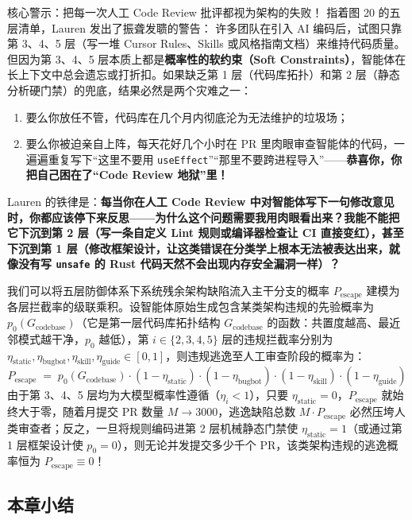\documentclass[a4paper]{article}
\begin{document}
\begin{warningbox}{核心警示：把每一次人工 Code Review 批评都视为架构的失败！}
指着图 20 的五层清单，Lauren 发出了振聋发聩的警告：
许多团队在引入 AI 编码后，试图只靠第 3、4、5 层（写一堆 Cursor Rules、Skills 或风格指南文档）来维持代码质量。但因为第 3、4、5 层本质上都是\textbf{概率性的软约束（Soft Constraints）}，智能体在长上下文中总会遗忘或打折扣。如果缺乏第 1 层（代码库拓扑）和第 2 层（静态分析硬门禁）的兜底，结果必然是两个灾难之一：
\begin{enumerate}
  \item 要么你放任不管，代码库在几个月内彻底沦为无法维护的垃圾场；
  \item 要么你被迫亲自上阵，每天花好几个小时在 PR 里肉眼审查智能体的代码，一遍遍重复写下“这里不要用 \texttt{useEffect}”“那里不要跨进程导入”——\textbf{恭喜你，你把自己困在了“Code Review 地狱”里！}
\end{enumerate}
Lauren 的铁律是：\textbf{每当你在人工 Code Review 中对智能体写下一句修改意见时，你都应该停下来反思——为什么这个问题需要我用肉眼看出来？我能不能把它下沉到第 2 层（写一条自定义 Lint 规则或编译器检查让 CI 直接变红），甚至下沉到第 1 层（修改框架设计，让这类错误在分类学上根本无法被表达出来，就像没有写 \texttt{unsafe} 的 Rust 代码天然不会出现内存安全漏洞一样）？}
\end{warningbox}

我们可以将五层防御体系下系统残余架构缺陷流入主干分支的概率 $P_{\text{escape}}$ 建模为各层拦截率的级联乘积。设智能体原始生成包含某类架构违规的先验概率为 $p_0(G_{\text{codebase}})$（它是第一层代码库拓扑结构 $G_{\text{codebase}}$ 的函数：共置度越高、最近邻模式越干净，$p_0$ 越低），第 $i \in \{2, 3, 4, 5\}$ 层的违规拦截率分别为 $\eta_{\text{static}}, \eta_{\text{bugbot}}, \eta_{\text{skill}}, \eta_{\text{guide}} \in [0, 1]$，则违规逃逸至人工审查阶段的概率为：
\begin{equation}
  P_{\text{escape}} \;=\; p_0(G_{\text{codebase}}) \cdot (1 - \eta_{\text{static}}) \cdot (1 - \eta_{\text{bugbot}}) \cdot (1 - \eta_{\text{skill}}) \cdot (1 - \eta_{\text{guide}})
\end{equation}
由于第 3、4、5 层均为大模型概率性遵循（$\eta_i < 1$），只要 $\eta_{\text{static}} = 0$，$P_{\text{escape}}$ 就始终大于零，随着月提交 PR 数量 $M \to 3000$，逃逸缺陷总数 $M \cdot P_{\text{escape}}$ 必然压垮人类审查者；反之，一旦将规则编码进第 2 层机械静态门禁使 $\eta_{\text{static}} = 1$（或通过第 1 层框架设计使 $p_0 = 0$），则无论并发提交多少千个 PR，该类架构违规的逃逸概率恒为 $P_{\text{escape}} \equiv 0$！

\subsection{本章小结}
\end{document}
